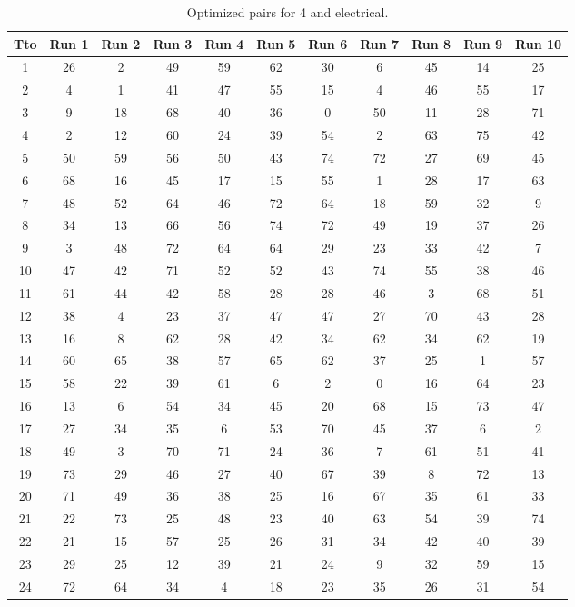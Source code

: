 \begin{table}
  \centering
  \scriptsize
  \caption{Optimized pairs for 4 and electrical.}
  \label{tab_pairs}
\begin{tabular}{c c c c c c c c c c c }
\hline
Tto & Run 1 & Run 2 & Run 3 & Run 4 & Run 5 & Run 6 & Run 7 & Run 8 & Run 9 & Run 10 \\
\hline
1 & 26 & 2 & 49 & 59 & 62 & 30 & 6 & 45 & 14 & 25 \\
2 & 4 & 1 & 41 & 47 & 55 & 15 & 4 & 46 & 55 & 17 \\
3 & 9 & 18 & 68 & 40 & 36 & 0 & 50 & 11 & 28 & 71 \\
4 & 2 & 12 & 60 & 24 & 39 & 54 & 2 & 63 & 75 & 42 \\
5 & 50 & 59 & 56 & 50 & 43 & 74 & 72 & 27 & 69 & 45 \\
6 & 68 & 16 & 45 & 17 & 15 & 55 & 1 & 28 & 17 & 63 \\
7 & 48 & 52 & 64 & 46 & 72 & 64 & 18 & 59 & 32 & 9 \\
8 & 34 & 13 & 66 & 56 & 74 & 72 & 49 & 19 & 37 & 26 \\
9 & 3 & 48 & 72 & 64 & 64 & 29 & 23 & 33 & 42 & 7 \\
10 & 47 & 42 & 71 & 52 & 52 & 43 & 74 & 55 & 38 & 46 \\
11 & 61 & 44 & 42 & 58 & 28 & 28 & 46 & 3 & 68 & 51 \\
12 & 38 & 4 & 23 & 37 & 47 & 47 & 27 & 70 & 43 & 28 \\
13 & 16 & 8 & 62 & 28 & 42 & 34 & 62 & 34 & 62 & 19 \\
14 & 60 & 65 & 38 & 57 & 65 & 62 & 37 & 25 & 1 & 57 \\
15 & 58 & 22 & 39 & 61 & 6 & 2 & 0 & 16 & 64 & 23 \\
16 & 13 & 6 & 54 & 34 & 45 & 20 & 68 & 15 & 73 & 47 \\
17 & 27 & 34 & 35 & 6 & 53 & 70 & 45 & 37 & 6 & 2 \\
18 & 49 & 3 & 70 & 71 & 24 & 36 & 7 & 61 & 51 & 41 \\
19 & 73 & 29 & 46 & 27 & 40 & 67 & 39 & 8 & 72 & 13 \\
20 & 71 & 49 & 36 & 38 & 25 & 16 & 67 & 35 & 61 & 33 \\
21 & 22 & 73 & 25 & 48 & 23 & 40 & 63 & 54 & 39 & 74 \\
22 & 21 & 15 & 57 & 25 & 26 & 31 & 34 & 42 & 40 & 39 \\
23 & 29 & 25 & 12 & 39 & 21 & 24 & 9 & 32 & 59 & 15 \\
24 & 72 & 64 & 34 & 4 & 18 & 23 & 35 & 26 & 31 & 54 \\

\end{tabular}
\end{table}
